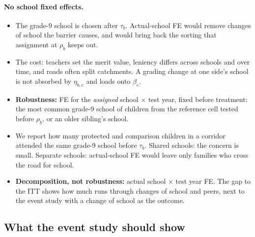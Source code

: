 \documentclass[11pt]{article}
\begin{document}
\paragraph{No school fixed effects.}
\begin{itemize}
\item The grade-9 school is chosen after \(\tau_b\). Actual-school FE would remove changes of
  school the barrier causes, and would bring back the sorting that assignment at \(\rho_b\)
  keeps out.
\item The cost: teachers set the merit value, leniency differs across schools and over time,
  and roads often split catchments. A grading change at one side's school is not absorbed by
  \(\eta_{b,e}\) and loads onto \(\beta_e\).
\item \textbf{Robustness:} FE for the \emph{assigned} school \(\times\) test year, fixed before
  treatment: the most common grade-9 school of children from the reference cell tested before
  \(\rho_b\), or an older sibling's school.
\item We report how many protected and comparison children in a corridor attended the same
  grade-9 school before \(\tau_b\). Shared schools: the concern is small. Separate schools:
  actual-school FE would leave only families who cross the road for school.
\item \textbf{Decomposition, not robustness:} actual school \(\times\) test year FE. The gap to
  the ITT shows how much runs through changes of school and peers, next to the event study with
  a change of school as the outcome.
\end{itemize}

\subsection{What the event study should show}\label{sec:predictions}
\end{document}

